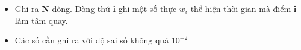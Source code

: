 \begin{itemize}
	\item     Ghi ra    \textbf{     N    }    dòng. Dòng thứ    \textbf{     i    }    ghi một số thực    \textbf{     $w_{i}$}    thể hiện thời gian mà điểm    \textbf{     i    }    làm tâm quay.   
	\item     Các số cần ghi ra với độ sai số không quá $10^{-2}$
\end{itemize}
